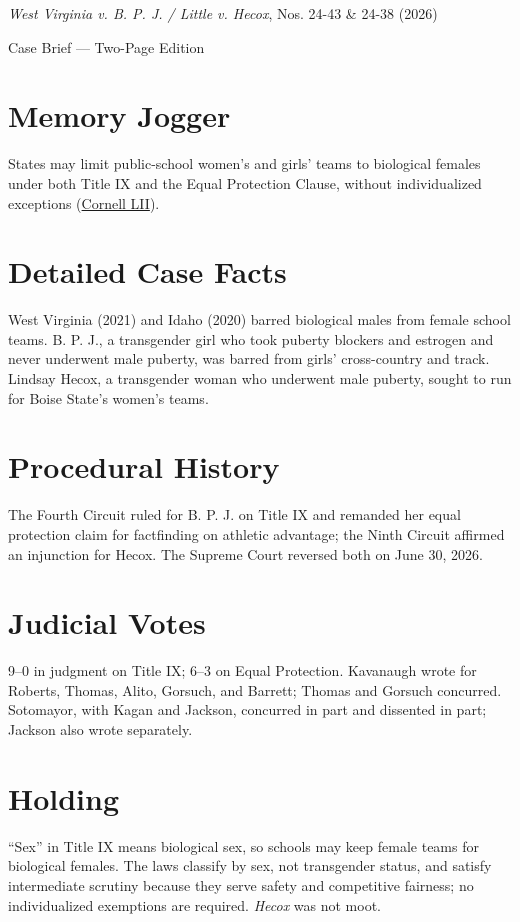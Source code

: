 \documentclass[12pt]{article}
\begin{document}
\begin{center}
{\LARGE \textit{West Virginia v. B. P. J. / Little v. Hecox}, Nos. 24-43 \& 24-38 (2026)\par}
\vspace{0.5em}
{\large Case Brief --- Two-Page Edition\par}
\end{center}

\section{Memory Jogger}
States may limit public-school women's and girls' teams to biological females under both Title IX and the Equal Protection Clause, without individualized exceptions (\href{https://www.law.cornell.edu/supremecourt/text/24-43}{Cornell LII}).

\section{Detailed Case Facts}
West Virginia (2021) and Idaho (2020) barred biological males from female school teams. B. P. J., a transgender girl who took puberty blockers and estrogen and never underwent male puberty, was barred from girls' cross-country and track. Lindsay Hecox, a transgender woman who underwent male puberty, sought to run for Boise State's women's teams.

\section{Procedural History}
The Fourth Circuit ruled for B. P. J. on Title IX and remanded her equal protection claim for factfinding on athletic advantage; the Ninth Circuit affirmed an injunction for Hecox. The Supreme Court reversed both on June 30, 2026.

\section{Judicial Votes}
9--0 in judgment on Title IX; 6--3 on Equal Protection. Kavanaugh wrote for Roberts, Thomas, Alito, Gorsuch, and Barrett; Thomas and Gorsuch concurred. Sotomayor, with Kagan and Jackson, concurred in part and dissented in part; Jackson also wrote separately.

\section{Holding}
``Sex'' in Title IX means biological sex, so schools may keep female teams for biological females. The laws classify by sex, not transgender status, and satisfy intermediate scrutiny because they serve safety and competitive fairness; no individualized exemptions are required. \textit{Hecox} was not moot.
\end{document}
